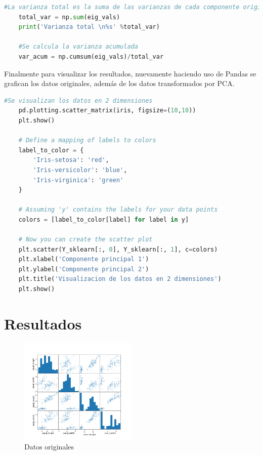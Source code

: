 \documentclass[conference]{IEEEtran}
\begin{document}
\begin{lstlisting}[language=Python, caption=Varianza acumulada]
    #La varianza total es la suma de las varianzas de cada componente original
    total_var = np.sum(eig_vals)
    print('Varianza total \n%s' %total_var)
    
    #Se calcula la varianza acumulada
    var_acum = np.cumsum(eig_vals)/total_var

\end{lstlisting}

Finalmente para visualizar los resultados, nuevamente haciendo uso de Pandas se grafican los datos originales, además de los datos transformados por PCA.
\begin{lstlisting}[language=Python, caption=Graficación de datos]
    #Se visualizan los datos en 2 dimensiones
    pd.plotting.scatter_matrix(iris, figsize=(10,10))
    plt.show()
    
    # Define a mapping of labels to colors
    label_to_color = {
        'Iris-setosa': 'red',
        'Iris-versicolor': 'blue',
        'Iris-virginica': 'green'
    }
    
    # Assuming 'y' contains the labels for your data points
    colors = [label_to_color[label] for label in y]
    
    # Now you can create the scatter plot
    plt.scatter(Y_sklearn[:, 0], Y_sklearn[:, 1], c=colors)
    plt.xlabel('Componente principal 1')
    plt.ylabel('Componente principal 2')
    plt.title('Visualizacion de los datos en 2 dimensiones')
    plt.show()

\end{lstlisting}

\section{Resultados}

\begin{figure}[H]
    \centering
    \includegraphics[width=0.5\textwidth]{images/originales.png}
    \caption{Datos originales}
    \label{fig:my_label}
\end{figure}
\end{document}
